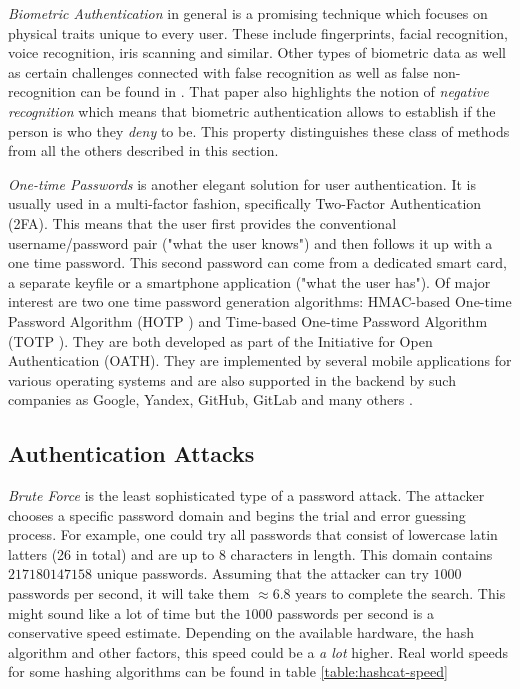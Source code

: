 \emph{Biometric Authentication} in general is a promising technique which focuses on physical traits unique to every user. These include fingerprints, facial recognition, voice recognition, iris scanning and similar. Other types of biometric data as well as certain challenges connected with false recognition as well as false non-recognition can be found in \cite{jain:2004:intro-to-biometric}. That paper also highlights the notion of \emph{negative recognition} which means that biometric authentication allows to establish if the person is who they \emph{deny} to be. This property distinguishes these class of methods from all the others described in this section.

\emph{One-time Passwords} is another elegant solution for user authentication. It is usually used in a multi-factor fashion, specifically Two-Factor Authentication (2FA). This means that the user first provides the conventional username/password pair ("what the user knows") and then follows it up with a one time password. This second password can come from a dedicated smart card, a separate keyfile or a smartphone application ("what the user has"). Of major interest are two one time password generation algorithms: HMAC-based One-time Password Algorithm (HOTP \cite{rfc4226}) and Time-based One-time Password Algorithm (TOTP \cite{rfc6238}). They are both developed as part of the Initiative for Open Authentication (OATH). They are implemented by several mobile applications for various operating systems and are also supported in the backend by such companies as Google, Yandex, GitHub, GitLab and many others \cite{wiki:2017:hotp-totp-companies}.

\subsection{Authentication Attacks}
\label{subsec:authentication-attacks}
\emph{Brute Force} is the least sophisticated type of a password attack. The attacker chooses a specific password domain and begins the trial and error guessing process. For example, one could try all passwords that consist of lowercase latin latters (26 in total) and are up to 8 characters in length. This domain contains \(217180147158\) unique passwords. Assuming that the attacker can try \(1000\) passwords per second, it will take them \(\approx 6.8\) years to complete the search. This might sound like a lot of time but the \(1000\) passwords per second is a conservative speed estimate. Depending on the available hardware, the hash algorithm and other factors, this speed could be a \emph{a lot} higher. Real world speeds for some hashing algorithms can be found in table \ref{table:hashcat-speed}

